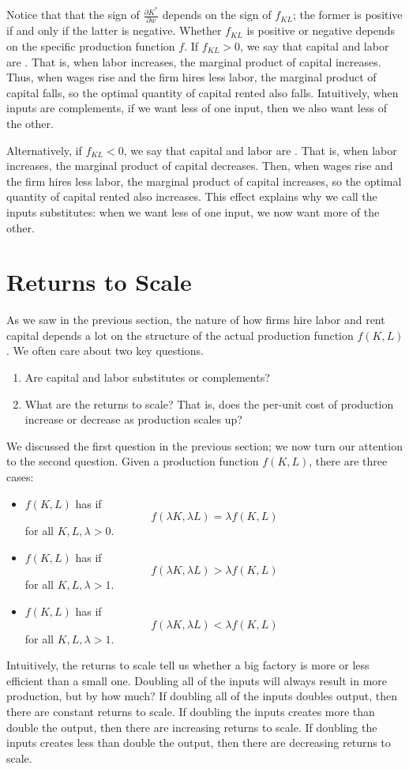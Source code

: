 Notice that that the sign of $\frac{\partial K^{*}}{\partial w}$ depends on the sign of $f_{KL}$; the former is positive if and only if the latter is negative. Whether $f_{KL}$ is positive or negative depends on the specific production function $f$. If $f_{KL} > 0$, we say that capital and labor are . That is, when labor increases, the marginal product of capital increases. Thus, when wages rise and the firm hires less labor, the marginal product of capital falls, so the optimal quantity of capital rented also falls. Intuitively, when inputs are complements, if we want less of one input, then we also want less of the other.

Alternatively, if $f_{KL} < 0$, we say that capital and labor are . That is, when labor increases, the marginal product of capital decreases. Then, when wages rise and the firm hires less labor, the marginal product of capital increases, so the optimal quantity of capital rented also increases. This effect explains why we call the inputs substitutes: when we want less of one input, we now want more of the other.

\section{Returns to Scale}
As we saw in the previous section, the nature of how firms hire labor and rent capital depends a lot on the structure of the actual production function $f(K, L)$. We often care about two key questions.
\begin{enumerate}
    \item Are capital and labor substitutes or complements?
    \item What are the returns to scale? That is, does the per-unit cost of production increase or decrease as production scales up?
\end{enumerate}
We discussed the first question in the previous section; we now turn our attention to the second question. Given a production function $f(K, L)$, there are three cases:
\begin{itemize}
    \item $f(K, L)$ has  if 
    $$f(\lambda K, \lambda L) = \lambda f(K, L)$$
    for all $K, L, \lambda > 0$.
    \item $f(K, L)$ has  if 
    $$f(\lambda K, \lambda L) > \lambda f(K, L)$$
    for all $K, L, \lambda > 1$.
    \item $f(K, L)$ has  if 
    $$f(\lambda K, \lambda L) < \lambda f(K, L)$$
    for all $K, L, \lambda > 1$.
\end{itemize}
Intuitively, the returns to scale tell us whether a big factory is more or less efficient than a small one. Doubling all of the inputs will always result in more production, but by how much? If doubling all of the inputs doubles output, then there are constant returns to scale. If doubling the inputs creates more than double the output, then there are increasing returns to scale. If doubling the inputs creates less than double the output, then there are decreasing returns to scale.

